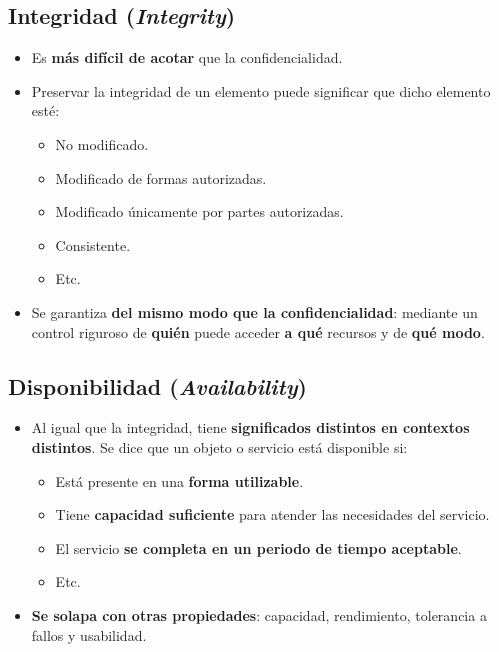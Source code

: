 \documentclass[11pt,a4paper]{report}
\begin{document}
\subsection{Integridad (\emph{Integrity})}

\begin{itemize}
  \item Es \textbf{más difícil de acotar} que la confidencialidad.
  \item Preservar la integridad de un elemento puede significar que dicho elemento esté:
    \begin{itemize}
      \item No modificado.
      \item Modificado de formas autorizadas.
      \item Modificado únicamente por partes autorizadas.
      \item Consistente.
      \item Etc.
    \end{itemize}
  \item Se garantiza \textbf{del mismo modo que la confidencialidad}: mediante un control riguroso de \textbf{quién} puede acceder \textbf{a qué} recursos y de \textbf{qué modo}.
\end{itemize}

\subsection{Disponibilidad (\emph{Availability})}

\begin{itemize}
  \item Al igual que la integridad, tiene \textbf{significados distintos en contextos distintos}. Se dice que un objeto o servicio está disponible si:
    \begin{itemize}
      \item Está presente en una \textbf{forma utilizable}.
      \item Tiene \textbf{capacidad suficiente} para atender las necesidades del servicio.
      \item El servicio \textbf{se completa en un periodo de tiempo aceptable}.
      \item Etc.
    \end{itemize}
  \item \textbf{Se solapa con otras propiedades}: capacidad, rendimiento, tolerancia a fallos y usabilidad.
\end{itemize}
\end{document}
